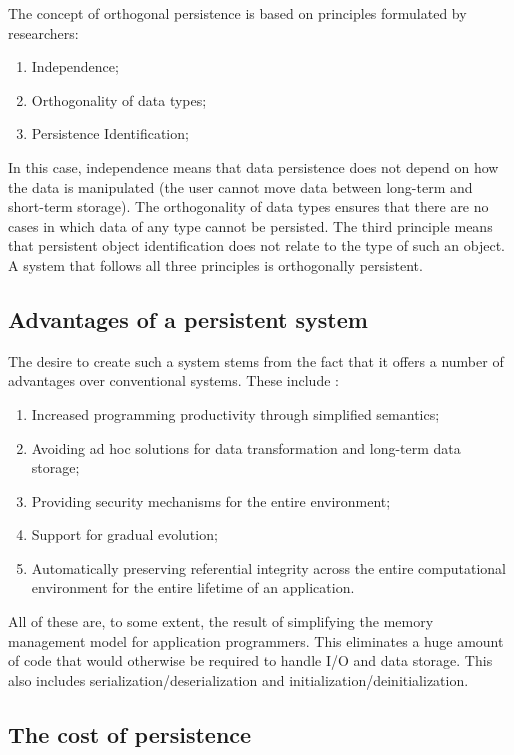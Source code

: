 The concept of orthogonal persistence is based on principles formulated by researchers:
\begin{enumerate}
    \item Independence;
    \item Orthogonality of data types;
    \item Persistence Identification;
\end{enumerate}
In this case, independence means that data persistence does not depend on how the data is manipulated (the user cannot move data between long-term and short-term storage). The orthogonality of data types ensures that there are no cases in which data of any type cannot be persisted. The third principle means that persistent object identification does not relate to the type of such an object. A system that follows all three principles is orthogonally persistent.

\subsection{Advantages of a persistent system}

The desire to create such a system stems from the fact that it offers a number of advantages over conventional systems. These include \cite{Revisited}:
\begin{enumerate}
    \item Increased programming productivity through simplified semantics;
    \item Avoiding ad hoc solutions for data transformation and long-term data storage;
    \item Providing security mechanisms for the entire environment;
    \item Support for gradual evolution;
    \item Automatically preserving referential integrity across the entire computational environment for the entire lifetime of an application.
\end{enumerate}
All of these are, to some extent, the result of simplifying the memory management model for application programmers. This eliminates a huge amount of code that would otherwise be required to handle I/O and data storage. This also includes serialization/deserialization and initialization/deinitialization.

\subsection{The cost of persistence}

